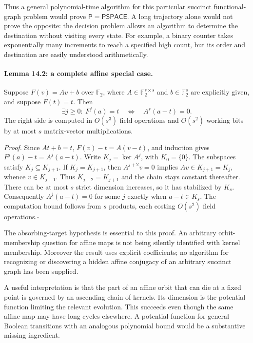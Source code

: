 \documentclass[11pt]{article}
\begin{document}
Thus a general polynomial-time algorithm for this particular succinct
functional-graph problem would prove $\mathsf P=\mathsf{PSPACE}$. A long
trajectory alone would not prove the opposite: the decision problem allows
an algorithm to determine the destination without visiting every state.
For example, a binary counter takes exponentially many increments to reach
a specified high count, but its order and destination are easily understood
arithmetically.

\paragraph{Lemma 14.2: a complete affine special case.}
Suppose $F(v)=Av+b$ over $\mathbb F_2$, where
$A\in\mathbb F_2^{s\times s}$ and $b\in\mathbb F_2^s$ are explicitly given,
and suppose $F(t)=t$. Then
\begin{equation}\label{a14:affine}
 \exists j\ge0:\ F^j(a)=t
                  \quad\Longleftrightarrow\quad A^s(a-t)=0.
\end{equation}
The right side is computed in $O(s^3)$ field operations and $O(s^2)$
working bits by at most $s$ matrix-vector multiplications.

\emph{Proof.} Since $At+b=t$,
$F(v)-t=A(v-t)$, and induction gives
$F^j(a)-t=A^j(a-t)$. Write $K_j=\ker A^j$, with $K_0=\{0\}$.
The subspaces satisfy $K_j\subseteq K_{j+1}$. If
$K_j=K_{j+1}$, then $A^{j+2}v=0$ implies
$Av\in K_{j+1}=K_j$, whence $v\in K_{j+1}$. Thus
$K_{j+2}=K_{j+1}$ and the chain stays constant thereafter. There can be
at most $s$ strict dimension increases, so it has stabilized by $K_s$.
Consequently $A^j(a-t)=0$ for some $j$ exactly when $a-t\in K_s$.
The computation bound follows from $s$ products, each costing $O(s^2)$
field operations.\hfill$\square$

The absorbing-target hypothesis is essential to this proof. An arbitrary
orbit-membership question for affine maps is not being silently identified
with kernel membership. Moreover the result uses explicit coefficients;
no algorithm for recognizing or discovering a hidden affine conjugacy of an
arbitrary succinct graph has been supplied.

A useful interpretation is that the part of an affine orbit that can die
at a fixed point is governed by an ascending chain of kernels. Its dimension
is the potential function limiting the relevant evolution. This succeeds
even though the same affine map may have long cycles elsewhere. A potential
function for general Boolean transitions with an analogous polynomial bound
would be a substantive missing ingredient.
\end{document}
